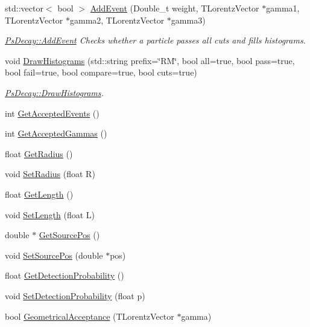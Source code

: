 \begin{DoxyCompactItemize}
std\+::vector$<$ bool $>$ \hyperlink{classPsDecay_a85fae0338b221eee90bf497819e71c84}{Add\+Event} (Double\+\_\+t weight, T\+Lorentz\+Vector $\ast$gamma1, T\+Lorentz\+Vector $\ast$gamma2, T\+Lorentz\+Vector $\ast$gamma3)
\begin{DoxyCompactList}\small\item\em \hyperlink{classPsDecay_a85fae0338b221eee90bf497819e71c84}{Ps\+Decay\+::\+Add\+Event} Checks whether a particle passes all cuts and fills histograms. \end{DoxyCompactList}\item 
void \hyperlink{classPsDecay_acf37a3232c075338710e7732da809fbe}{Draw\+Histograms} (std\+::string prefix=\char`\"{}RM\char`\"{}, bool all=true, bool pass=true, bool fail=true, bool compare=true, bool cuts=true)
\begin{DoxyCompactList}\small\item\em \hyperlink{classPsDecay_acf37a3232c075338710e7732da809fbe}{Ps\+Decay\+::\+Draw\+Histograms}. \end{DoxyCompactList}\item 
int \hyperlink{classPsDecay_a72748b543e708190792f542589d400bf}{Get\+Accepted\+Events} ()
\item 
int \hyperlink{classPsDecay_a3d38be1c590da4bd4831fd6399cee2fc}{Get\+Accepted\+Gammas} ()
\item 
float \hyperlink{classPsDecay_ac0517f667702f7e1bee0d20db672ab9a}{Get\+Radius} ()
\item 
void \hyperlink{classPsDecay_a86a0cf5299fdd8a300b749a0bc315664}{Set\+Radius} (float R)
\item 
float \hyperlink{classPsDecay_a82413603fa5eda90d972b6f32843b100}{Get\+Length} ()
\item 
void \hyperlink{classPsDecay_aed3ef319a61a3229a586956fbe1827ad}{Set\+Length} (float L)
\item 
double $\ast$ \hyperlink{classPsDecay_a6fc8d3c99830bfde08ab095401eb1638}{Get\+Source\+Pos} ()
\item 
void \hyperlink{classPsDecay_a574ae1e69be02777efc29d897b743c7d}{Set\+Source\+Pos} (double $\ast$pos)
\item 
float \hyperlink{classPsDecay_a9b62d4d9f520a79e4e31c923a6ceff3e}{Get\+Detection\+Probability} ()
\item 
void \hyperlink{classPsDecay_a5bc4bac0d5e0002e7ffefbc57762e4a4}{Set\+Detection\+Probability} (float p)
\item 
bool \hyperlink{classPsDecay_a3988e06145dee5f112aee8b256b4cab8}{Geometrical\+Acceptance} (T\+Lorentz\+Vector $\ast$gamma)

\end{DoxyCompactItemize}
